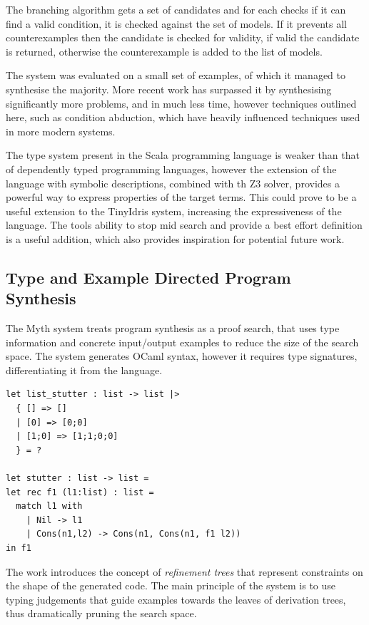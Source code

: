 \documentclass[a4paper]{article}
\begin{document}
The branching algorithm gets a set of candidates and for each checks if it can find a valid condition, it is checked 
against the set of models. If it prevents all counterexamples then the candidate is checked for validity, if valid the 
candidate is returned, otherwise the counterexample is added to the list of models. 

The system was evaluated on a small set of examples, of which it managed to synthesise the majority. More recent work 
has surpassed it by synthesising significantly more problems, and in much less time, however techniques outlined here, 
such as condition abduction, which have heavily influenced techniques used in more modern systems.

The type system present in the Scala programming language is weaker
than that of dependently typed programming languages, however the
extension of the language with symbolic descriptions, combined with th
Z3 solver, provides a powerful way to express properties of the
target terms. This could prove to be a useful extension to the
TinyIdris system, increasing the expressiveness of the language.
The tools ability to stop mid search and provide a best
effort definition is a useful addition, which also provides
inspiration for potential future work. 

\subsection{Type and Example Directed Program Synthesis}
\label{sec:org97dc857}
The Myth system treats program synthesis as a proof search, that uses
type information and concrete input/output examples to reduce the size
of the search space. The system generates OCaml syntax, however it 
requires type signatures, differentiating it from the language.

\begin{center}
\begin{verbatim}
let list_stutter : list -> list |>
  { [] => []
  | [0] => [0;0]
  | [1;0] => [1;1;0;0]
  } = ?

let stutter : list -> list =
let rec f1 (l1:list) : list =
  match l1 with 
	| Nil -> l1
	| Cons(n1,l2) -> Cons(n1, Cons(n1, f1 l2))
in f1
\end{verbatim}
\end{center}

The work introduces the concept of \emph{refinement trees} that represent constraints on the shape of the generated code. 
The main principle of the system is to use typing judgements that guide examples towards the leaves of derivation trees,
thus dramatically pruning the search space.  
\end{document}
